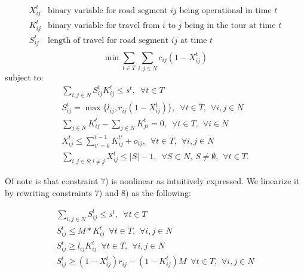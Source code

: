 \documentclass{article}
\begin{document}
\begin{displaymath}
\begin{array}{ll}
X_{ij}^t & \mbox{binary variable for road segment $ij$ being operational in time $t$}\\
K_{ij}^t & \mbox{binary variable for travel from $i$ to $j$ being in the tour at time $t$}\\
S_{ij}^t & \mbox{length of travel for road segment $ij$ at time $t$}\\
\end{array}
\end{displaymath}	
\begin{equation}
\min \sum_{t \in T}  \sum_{i,j \in N} c_{ij}(1-X_{ij}^t) 
\end{equation}
subject to:
\begin{eqnarray}
\sum_{i,j \in N} S_{ij}^t K_{ij}^t \leq s^t, \hspace{6pt} \forall t\in T \\
S_{ij}^t = \max \{l_{ij}, r_{ij}(1-X_{ij}^t) \}, \hspace{6pt} \forall t\in T, \hspace{5pt} \forall i,j \in N\\
\sum_{j \in N} K_{ij}^t - \sum_{j \in N} K_{ji}^t = 0, \hspace{6pt} \forall t\in T, \hspace{5pt} \forall i \in N\\
X_{ij}^t \le \sum_{t'=0}^{t-1} K_{ij}^{t'} + o_{ij} , \hspace{6pt} \forall t\in T,  \hspace{5pt} \forall i,j \in N\\
\sum_{i,j \in S; i\neq j} X_{ij}^t \leq |S|-1, \hspace{6pt} \forall S \subset N, \hspace{2pt} S \neq \emptyset, \hspace{5pt} \forall t\in T.
\end{eqnarray}

Of note is that constraint 7) is nonlinear as intuitively expressed. We linearize it by rewriting constraints 7) and 8) as the following:

\begin{eqnarray}
\sum_{i,j \in N} S_{ij}^t \leq s^t, \hspace{6pt} \forall t\in T \\
S_{ij}^t \leq M*K_{ij}^t \hspace{6pt} \forall t\in T, \hspace{5pt} \forall i,j \in N\\
S_{ij}^t \geq l_{ij}K_{ij}^t \hspace{6pt} \forall t\in T, \hspace{5pt} \forall i,j \in N\\
S_{ij}^t \geq (1-X_{ij}^t)r_{ij} - (1-K_{ij}^t)M \hspace{6pt} \forall t\in T, \hspace{5pt} \forall i,j \in N
\end{eqnarray}
\end{document}
